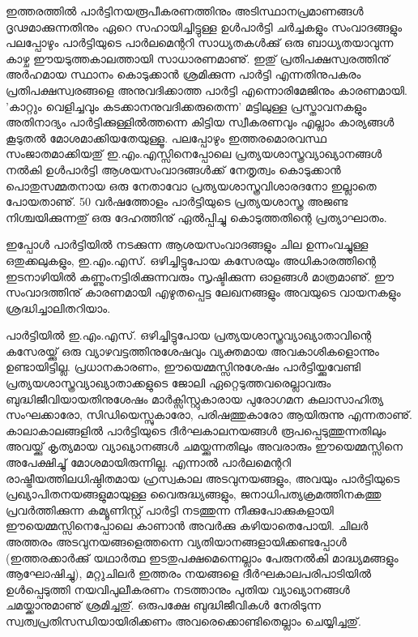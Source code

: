 ഇത്തരത്തില്‍ പാര്‍ട്ടിനയരൂപീകരണത്തിനും അടിസ്ഥാനപ്രമാണങ്ങള്‍ ദൃഢമാക്കുന്നതിനും ഏറെ സഹായിച്ചിട്ടുള്ള 
ഉള്‍പാര്‍ട്ടി ചര്‍ച്ചകളും സംവാദങ്ങളും പലപ്പോഴും പാര്‍ട്ടിയുടെ പാര്‍ലമെന്ററി സാധ്യതകള്‍ക്കു് ഒരു ബാധ്യതയാവുന്ന 
കാഴ്ച ഈയടുത്തകാലത്തായി സാധാരണമാണു്. ഇതു് പ്രതിപക്ഷസ്വരത്തിനു് അര്‍ഹമായ സ്ഥാനം കൊടുക്കാന്‍ 
ശ്രമിക്കുന്ന പാര്‍ട്ടി എന്നതിനുപകരം പ്രതിപക്ഷസ്വരങ്ങളെ അനുവദിക്കാത്ത പാര്‍ട്ടി എന്നൊരിമേജിനും കാരണമായി. 
'കാറ്റും വെളിച്ചവും കടക്കാനനുവദിക്കരുതെന്ന' മട്ടിലുള്ള പ്രസ്താവനകളും അതിനാദ്യം പാര്‍ട്ടിക്കുള്ളില്‍ത്തന്നെ കിട്ടിയ 
സ്വീകരണവും എല്ലാം കാര്യങ്ങള്‍ കൂടുതല്‍ മോശമാക്കിയതേയുള്ളൂ. പലപ്പോഴും ഇത്തരമൊരവസ്ഥ സംജാതമാക്കിയതു്
ഇ.എം.എസ്സിനെപ്പോലെ പ്രത്യയശാസ്ത്രവ്യാഖ്യാനങ്ങള്‍ നല്‍കി ഉള്‍പാര്‍ട്ടി ആശയസംവാദങ്ങള്‍ക്ക് നേതൃത്വം കൊടുക്കാന്‍
പൊതുസമ്മതനായ ഒരു നേതാവോ പ്രത്യയശാസ്ത്രവിശാരദനോ ഇല്ലാതെ പോയതാണു്. 50 വര്‍ഷത്തോളം പാര്‍ട്ടിയുടെ 
പ്രത്യയശാസ്ത്ര അജണ്ട നിശ്ചയിക്കുന്നതു് ഒരു ദേഹത്തിനു് ഏല്‍പ്പിച്ചു കൊടുത്തതിന്റെ പ്രത്യാഘാതം.

ഇപ്പോള്‍ പാര്‍ട്ടിയില്‍ നടക്കുന്ന ആശയസംവാദങ്ങളും ചില ഉന്നംവച്ചുള്ള ഒതുക്കലുകളും, ഇ.എം.എസ്. ഒഴിച്ചിട്ടുപോയ 
കസേരയും അധികാരത്തിന്റെ ഇടനാഴിയില്‍ കണ്ണുംനട്ടിരിക്കുന്നവരും സൃഷ്ടിക്കുന്ന ഓളങ്ങള്‍ മാത്രമാണു്. ഈ 
സംവാദത്തിനു് കാരണമായി എഴുതപ്പെട്ട ലേഖനങ്ങളും അവയുടെ വായനകളും ശ്രദ്ധിച്ചാലിതറിയാം.

പാര്‍ട്ടിയില്‍ ഇ.എം.എസ്. ഒഴിച്ചിട്ടുപോയ പ്രത്യയശാസ്ത്രവ്യാഖ്യാതാവിന്റെ കസേരയ്ക്കു് ഒരു വ്യാഴവട്ടത്തിനുശേഷവും 
വ്യക്തമായ അവകാശികളൊന്നും ഉണ്ടായിട്ടില്ല. പ്രധാനകാരണം, ഈയെമ്മസ്സിനുശേഷം പാര്‍ട്ടിയ്ക്കുവേണ്ടി 
പ്രത്യയശാസ്ത്രവ്യാഖ്യാതാക്കളുടെ ജോലി ഏറ്റെടുത്തവരെല്ലാവരും ബുദ്ധിജീവിയായതിനുശേഷം മാര്‍ക്സിസ്റ്റുകാരായ 
പുരോഗമന കലാസാഹിത്യ സംഘക്കാരോ, സിഡിയെസ്സുകാരോ, പരിഷത്തുകാരോ ആയിരുന്നു എന്നതാണു്. 
കാലാകാലങ്ങളില്‍ പാര്‍ട്ടിയുടെ ദീര്‍ഘകാലനയങ്ങള്‍ രൂപപ്പെടുത്തുന്നതിലും അവയ്ക്കു് കൃത്യമായ വ്യാഖ്യാനങ്ങള്‍ 
ചമയ്ക്കുന്നതിലും അവരാരും ഈയെമ്മസ്സിനെ അപേക്ഷിച്ചു് മോശമായിരുന്നില്ല. എന്നാല്‍ പാര്‍ലമെന്ററി 
രാഷ്ട്രീയത്തിലധിഷ്ഠിതമായ ഹ്രസ്വകാല അടവുനയങ്ങളും, അവയും പാര്‍ട്ടിയുടെ പ്രഖ്യാപിതനയങ്ങളുമായുള്ള 
വൈരുദ്ധ്യങ്ങളും, ജനാധിപത്യക്രമത്തിനകത്തു പ്രവര്‍ത്തിക്കുന്ന കമ്യൂണിസ്റ്റ് പാര്‍ട്ടി നടത്തുന്ന 
നീക്കുപോക്കുകളായി ഈയെമ്മസ്സിനെപ്പോലെ കാണാന്‍ അവര്‍ക്കു കഴിയാതെപോയി. ചിലര്‍ അത്തരം അടവുനയങ്ങളെത്തന്നെ 
വ്യതിയാനങ്ങളായിക്കണ്ടപ്പോള്‍ (ഇത്തരക്കാര്‍ക്കു് യഥാര്‍ത്ഥ ഇടതുപക്ഷമെന്നെല്ലാം പേരുനല്‍കി മാദ്ധ്യമങ്ങളും 
ആഘോഷിച്ചു), മറ്റുചിലര്‍ ഇത്തരം നയങ്ങളെ ദീര്‍ഘകാലപരിപാടിയില്‍ ഉള്‍പ്പെടുത്തി നയവിപുലീകരണം നടത്താനും 
പുതിയ വ്യാഖ്യാനങ്ങള്‍ ചമയ്ക്കാനുമാണു് ശ്രമിച്ചതു്. ഒരുപക്ഷേ ബുദ്ധിജീവികള്‍ നേരിടുന്ന സ്വത്വപ്രതിസന്ധിയായിരിക്കണം 
അവരെക്കൊണ്ടിതെല്ലാം ചെയ്യിച്ചതു്.

